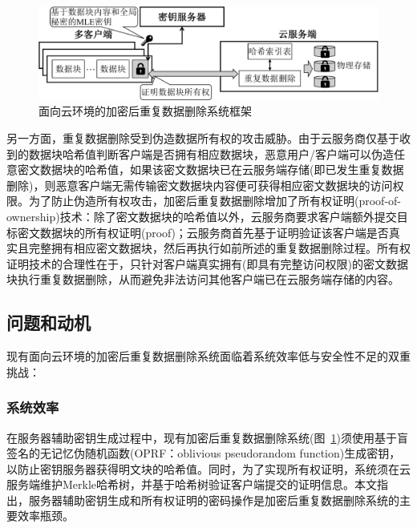 \begin{figure}[!htb]
    \small
    \centering
    \includegraphics[width=\textwidth]{pic/background/Cloud-encrypted-deduplication-logic.pdf}
    \caption{面向云环境的加密后重复数据删除系统框架}
    \label{fig:Cloud-based-encrypted-deduplication-storage-logic}
\end{figure}

另一方面，重复数据删除受到伪造数据所有权的攻击威胁\cite{harnik2010side,mulazzani11}。由于云服务商仅基于收到的数据块哈希值判断客户端是否拥有相应数据块，恶意用户/客户端可以伪造任意密文数据块的哈希值，如果该密文数据块已在云服务端存储(即已发生重复数据删除)，则恶意客户端无需传输密文数据块内容便可获得相应密文数据块的访问权限。为了防止伪造所有权攻击，加密后重复数据删除增加了所有权证明(proof-of-ownership)技术\cite{halevi11}：除了密文数据块的哈希值以外，云服务商要求客户端额外提交目标密文数据块的所有权证明(proof)；云服务商首先基于证明验证该客户端是否真实且完整拥有相应密文数据块，然后再执行如前所述的重复数据删除过程。所有权证明技术的合理性在于，只针对客户端真实拥有(即具有完整访问权限)的密文数据块执行重复数据删除，从而避免非法访问其他客户端已在云服务端存储的内容。

\subsection{问题和动机}
\label{subsec:intro-problem}

现有面向云环境的加密后重复数据删除系统面临着系统效率低与安全性不足的双重挑战：

\subsubsection{系统效率}
\label{subsubsec:intro-problem-performance}

在服务器辅助密钥生成过程中，现有加密后重复数据删除系统(图~\ref{fig:Cloud-based-encrypted-deduplication-storage-logic})须使用基于盲签名\cite{armknecht2015transparent,bellare2013DupLESS}的无记忆伪随机函数(OPRF：oblivious pseudorandom function)生成密钥\cite{bellare2013DupLESS}，以防止密钥服务器获得明文块的哈希值。同时，为了实现所有权证明，系统须在云服务端维护Merkle哈希树，并基于哈希树验证客户端提交的证明信息\cite{halevi2011proofs}。本文指出，服务器辅助密钥生成和所有权证明的密码操作是加密后重复数据删除系统的主要效率瓶颈。


